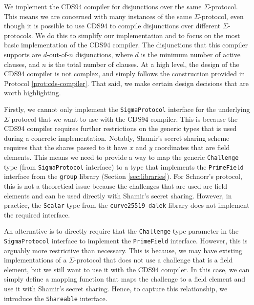 We implement the CDS94 compiler for disjunctions over the same $\Sigma$-protocol. This means we are concerned 
with many instances of the same $\Sigma$-protocol, even though it is possible to use CDS94 to compile 
disjunctions over different $\Sigma$-protocols. We do this to simplify our implementation and to focus on the 
most basic implementation of the CDS94 compiler. The disjunctions that this compiler supports are $d$-out-of-$n$
disjunctions, where $d$ is the minimum number of active clauses, and $n$ is the total number of clauses.
At a high level, the design of the CDS94 compiler is not complex, and simply follows the construction provided 
in Protocol \ref{prot:cds-compiler}. That said, we make certain design decisions that are worth highlighting.

Firstly, we cannot only implement the \texttt{SigmaProtocol} interface for the underlying $\Sigma$-protocol
that we want to use with the CDS94 compiler.
This is because the CDS94 compiler requires further restrictions on the generic 
types that is used during a concrete implementation. Notably, Shamir's secret sharing scheme requires that 
the shares passed to it have $x$ and $y$ coordinates that are field elements. This means we need to 
provide a way to map the generic \texttt{Challenge} type (from \texttt{SigmaProtocol} interface) to a 
type that implements the \texttt{PrimeField} interface from the \texttt{group} library (Section \ref{sec:libraries}).
For Schnorr's protocol, this is not a theoretical issue because the challenges that are used are field elements
and can be used directly with Shamir's secret sharing. However, in practice, the \texttt{Scalar} type from the
\texttt{curve25519-dalek} library does not implement the required interface. 

An alternative is to directly require that the \texttt{Challenge}
type parameter in the \texttt{SigmaProtocol} interface to implement the \texttt{PrimeField} interface. However,
this is arguably more restrictive than necessary. This is because, we may have existing implementations of a 
$\Sigma$-protocol that does not use a challenge that is a field element, but we still want to use it with the
CDS94 compiler. In this case, we can simply define a mapping function that maps the challenge to a field element
and use it with Shamir's secret sharing. 
Hence, to capture this relationship, we introduce the \texttt{Shareable} interface.


